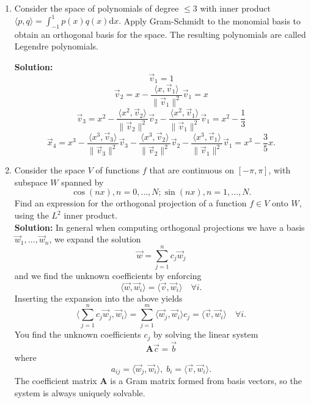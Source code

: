 \documentclass[11pt,fleqn]{article}
\begin{document}
\begin{enumerate}
\item Consider the space of polynomials of degree $\le 3$ with inner product $\langle p,q\rangle = \int_{-1}^1p(x)q(x)\mathrm{d}x.$ Apply Gram-Schmidt to the monomial basis to obtain an orthogonal basis for the space. The resulting polynomials are called Legendre polynomials.

{\bf Solution:} 
\[\vec{v}_1 = 1\]
\[\vec{v}_2 = x - \frac{\langle x,\vec{v}_1\rangle}{\|\vec{v}_1\|^2}\vec{v}_1 = x\]
\[\vec{v}_3 = x^2 -\frac{\langle x^2,\vec{v}_2\rangle}{\|\vec{v}_2\|^2}\vec{v}_2- \frac{\langle x^2,\vec{v}_1\rangle}{\|\vec{v}_1\|^2}\vec{v}_1 = x^2 - \frac{1}{3}\]
\[\vec{x}_4 = x^3 - \frac{\langle x^3,\vec{v}_3\rangle}{\|\vec{v}_3\|^2}\vec{v}_3- \frac{\langle x^3,\vec{v}_2\rangle}{\|\vec{v}_2\|^2}\vec{v}_2- \frac{\langle x^3,\vec{v}_1\rangle}{\|\vec{v}_1\|^2}\vec{v}_1 = x^3 - \frac{3}{5}x.\]
\item Consider the space $V$ of functions $f$ that are continuous on $[-\pi,\pi]$, with subspace $W$ spanned by
\[\cos(nx),n=0,\ldots,N;\sin(nx),n=1,\ldots,N.\]
Find an expression for the orthogonal projection of a function $f\in V$ onto $W$, using the $L^2$ inner product.\\

{\bf Solution:} In general when computing orthogonal projections we have a basis $\vec{w}_1,\ldots,\vec{w}_n$, we expand the solution 
\[\vec{w} = \sum_{j=1}^n c_j\vec{w}_j\]
and we find the unknown coefficients by enforcing
\[\langle\vec{w},\vec{w}_i\rangle = \langle\vec{v},\vec{w}_i\rangle\quad\forall i.\]
Inserting the expansion into the above yields
\[\langle\sum_{j=1}^nc_j\vec{w}_j,\vec{w}_i\rangle = \sum_{j=1}^m\langle\vec{w}_j,\vec{w}_i\rangle c_j = \langle\vec{v},\vec{w}_i\rangle\quad\forall i.\]
You find the unknown coefficients $c_j$ by solving the linear system
\[\mathbf{A}\vec{c} = \vec{b}\]
where
\[a_{ij} = \langle\vec{w}_j,\vec{w}_i\rangle,\;b_i = \langle\vec{v},\vec{w}_i\rangle.\]
The coefficient matrix {\bf A} is a Gram matrix formed from basis vectors, so the system is always uniquely solvable.\\


\end{enumerate}
\end{document}
